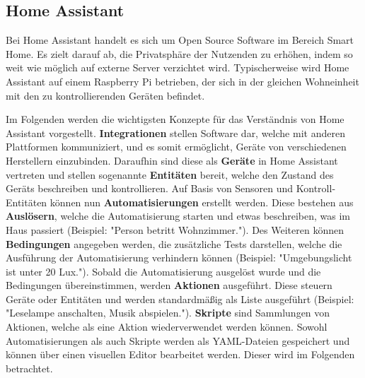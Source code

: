 \newcommand{\hascwidth}{.49\textwidth}
\subsection{Home Assistant}

Bei Home Assistant handelt es sich um Open Source Software im Bereich Smart Home. Es zielt darauf ab, die Privatsphäre der Nutzenden zu erhöhen, indem so weit wie möglich auf externe Server verzichtet wird. Typischerweise wird Home Assistant auf einem Raspberry Pi betrieben, der sich in der gleichen Wohneinheit mit den zu kontrollierenden Geräten befindet.
\parencite{openhomefoundationHomeAssistant}

Im Folgenden werden die wichtigsten Konzepte für das Verständnis von Home Assistant vorgestellt. \textbf{Integrationen} stellen Software dar, welche mit anderen Plattformen kommuniziert, und es somit ermöglicht, Geräte von verschiedenen Herstellern einzubinden. Daraufhin sind diese als \textbf{Geräte} in Home Assistant vertreten und stellen sogenannte \textbf{Entitäten} bereit, welche den Zustand des Geräts beschreiben und kontrollieren. Auf Basis von Sensoren und Kontroll-Entitäten können nun \textbf{Automatisierungen} erstellt werden. Diese bestehen aus \textbf{Auslösern}, welche die Automatisierung starten und etwas beschreiben, was im Haus passiert (Beispiel: "Person betritt Wohnzimmer."). Des Weiteren können \textbf{Bedingungen} angegeben werden, die zusätzliche Tests darstellen, welche die Ausführung der Automatisierung verhindern können (Beispiel: "Umgebungslicht ist unter 20 Lux."). Sobald die Automatisierung ausgelöst wurde und die Bedingungen übereinstimmen, werden \textbf{Aktionen} ausgeführt. Diese steuern Geräte oder Entitäten und werden standardmäßig als Liste ausgeführt (Beispiel: "Leselampe anschalten, Musik abspielen."). \textbf{Skripte} sind Sammlungen von Aktionen, welche als eine Aktion wiederverwendet werden können. \parencite{openhomefoundationConceptsTerminology} Sowohl Automatisierungen als auch Skripte werden als \ac{YAML}-Dateien gespeichert und können über einen visuellen Editor bearbeitet werden. Dieser wird im Folgenden betrachtet.

